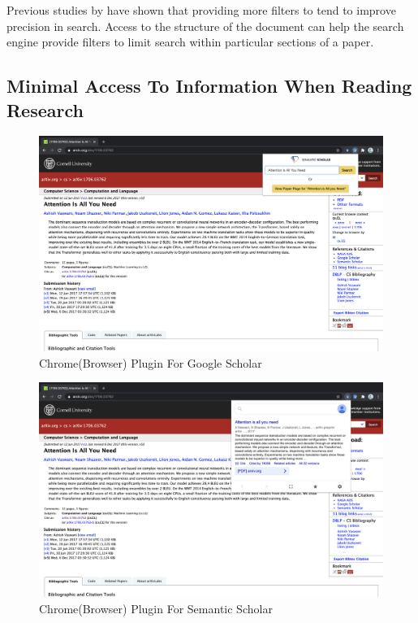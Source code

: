 Previous studies by \parencite{kacem2018analysis} have shown that providing more filters to tend to improve precision in search. Access to the structure of the document can help the search engine provide filters to limit search within particular sections of a paper.

\pagebreak
\subsection{Minimal Access To Information When Reading Research}
\begin{figure}[h]
    \centering
    \includegraphics[width=\maxwidth{\textwidth}]{src/images/gg-plugin.png}
    \caption{Chrome(Browser) Plugin For Google Scholar}
    \label{figure\arabic{figurecounter}}
\end{figure}
\begin{figure}[h]
    \centering
    \includegraphics[width=\maxwidth{\textwidth}]{src/images/ss-plugin.png}
    \caption{Chrome(Browser) Plugin For Semantic Scholar}
    \label{figure\arabic{figurecounter}}
\end{figure}
